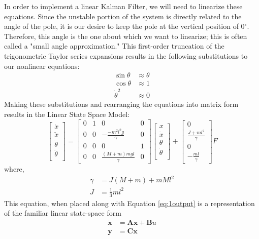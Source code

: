 \documentclass{article}
\newcommand{\matr}[1]{\bm{#1}}     %
\begin{document}
In order to implement a linear Kalman Filter, we will need to linearize these equations. Since the unstable portion of the system is directly related to the angle of the pole, it is our desire to keep the pole at the vertical position of 0$^\circ$. Therefore, this angle is the one about which we want to linearize; this is often called a "small angle approximation." This first-order truncation of the trigonometric Taylor series expansions results in the following substitutions to our nonlinear equations:
\begin{align*}
\sin \theta &\approx \theta \\
\cos \theta &\approx 1 \\
\dot{\theta}^2 &\approx 0
\end{align*}
Making these substitutions and rearranging the equations into matrix form results in the Linear State Space Model:
\begin{equation}
\begin{bmatrix}
	\dot{x} \\
	\ddot{x} \\
	\dot{\theta} \\
	\ddot{\theta} \\
\end{bmatrix} = \begin{bmatrix}
0 & 1 & 0 & 0 \\
0 & 0 & -\frac{-m^2l^2g}{\gamma} & 0 \\
0 & 0 & 0 & 1\\
0 & 0 & \frac{(M+m)mgl}{\gamma} & 0
\end{bmatrix} \begin{bmatrix}
	x \\
	\dot{x} \\
	\theta \\
	\dot{\theta} \\
\end{bmatrix}  + \begin{bmatrix}
0 \\
\frac{J+ml^2}{\gamma} \\
0 \\
-\frac{ml}{\gamma}
\end{bmatrix} F
\label{eq:ss_continuous}
\end{equation}
where, 
\begin{align*}
\gamma &= J(M+m)+mMl^2 \\
J &= \frac{1}{3}ml^2
\end{align*}
This equation, when placed along with Equation \ref{eq:1output} is a representation of the familiar linear state-space form
\begin{equation*}
\begin{aligned}
\matr{\dot{x}} &= \matr{A}\matr{x} + \matr{B}u \\
\matr{y} &= \matr{C}\matr{x}
\end{aligned}
\end{equation*}
\end{document}
